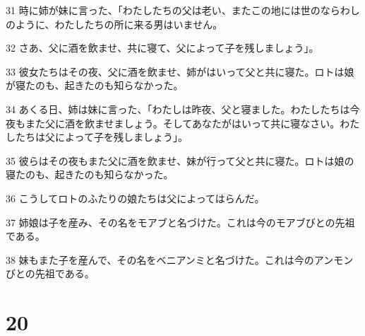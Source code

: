 \par 31 時に姉が妹に言った、「わたしたちの父は老い、またこの地には世のならわしのように、わたしたちの所に来る男はいません。
\par 32 さあ、父に酒を飲ませ、共に寝て、父によって子を残しましょう」。
\par 33 彼女たちはその夜、父に酒を飲ませ、姉がはいって父と共に寝た。ロトは娘が寝たのも、起きたのも知らなかった。
\par 34 あくる日、姉は妹に言った、「わたしは昨夜、父と寝ました。わたしたちは今夜もまた父に酒を飲ませましょう。そしてあなたがはいって共に寝なさい。わたしたちは父によって子を残しましょう」。
\par 35 彼らはその夜もまた父に酒を飲ませ、妹が行って父と共に寝た。ロトは娘の寝たのも、起きたのも知らなかった。
\par 36 こうしてロトのふたりの娘たちは父によってはらんだ。
\par 37 姉娘は子を産み、その名をモアブと名づけた。これは今のモアブびとの先祖である。
\par 38 妹もまた子を産んで、その名をベニアンミと名づけた。これは今のアンモンびとの先祖である。

\chapter{20}

